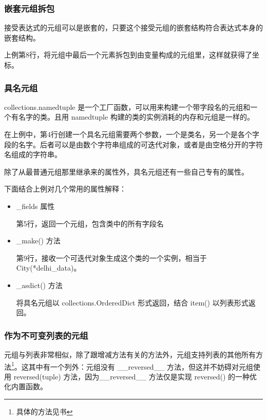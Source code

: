 \subsubsection{嵌套元组拆包}

接受表达式的元组可以是嵌套的，只要这个接受元组的嵌套结构符合表达式本身的嵌套结构。



上例第8行，将元组中最后一个元素拆包到由变量构成的元组里，这样就获得了坐标。

\subsubsection{具名元组}

collections.namedtuple 是一个工厂函数，可以用来构建一个带字段名的元组和一个有名字的类。且用 namedtuple 构建的类的实例消耗的内存和元组是一样的。



在上例中，第4行创建一个具名元组需要两个参数，一个是类名，另一个是各个字段的名字。后者可以是由数个字符串组成的可迭代对象，或者是由空格分开的字符名组成的字符串。

除了从最普通元组那里继承来的属性外，具名元组还有一些自己专有的属性。



下面结合上例对几个常用的属性解释：
\begin{itemize}
    \item \_fields 属性
    
    第5行，返回一个元组，包含类中的所有字段名

    \item \_make() 方法
    
    第9行，接收一个可迭代对象生成这个类的一个实例，相当于 City(*delhi\_data)。
    
    \item \_asdict() 方法
    
    将具名元组以 collections.OrderedDict 形式返回，结合 item() 以列表形式返回。
\end{itemize}

\subsubsection{作为不可变列表的元组}

元组与列表非常相似，除了跟增减方法有关的方法外，元组支持列表的其他所有方法\footnote{具体的方法见书}。这其中有一个列外：元组没有 \_\_reversed\_\_ 方法，但这并不妨碍对元组使用 reversed(tuple) 方法，因为\_\_reversed\_\_ 方法仅是实现 reversed() 的一种优化内置函数。

